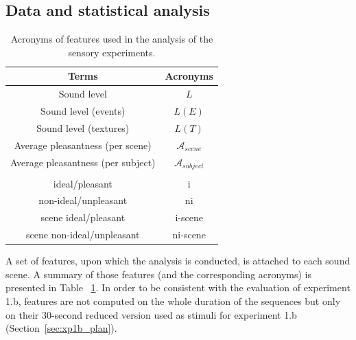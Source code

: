 \documentclass[12pt]{elsarticle}
\newcommand{\cf}{cf.}
\begin{document}
\subsection{Data and statistical analysis}
\label{sec:xp1_dataAna}

\begin{table}[t]
\centering
\begin{tabular}{c c}
Terms                              & Acronyms                   \\
\hline
Sound level                        & $L$                        \\
Sound level (events)               & $L(E)$                     \\
Sound level (textures)             & $L(T)$                     \\
Average pleasantness (per scene)   & $\mathcal{A}_{scene}$      \\
Average pleasantness (per subject) & $\mathcal{A}_{subject}$      \\
                                   &                            \\
ideal/pleasant                     & i                          \\
non-ideal/unpleasant               & ni                         \\
scene ideal/pleasant               & i-scene                    \\
scene non-ideal/unpleasant         & ni-scene                   \\
\hline
\end{tabular}
\vspace{0.5mm}
\caption{Acronyms of features used in the analysis of the sensory experiments.}
\label{tab:acronyme}
\end{table}


A set of features, upon which the analysis is conducted, is attached to each sound scene. A summary of those features (and the corresponding acronyms) is presented in Table ~\ref{tab:acronyme}. In order to be consistent with the evaluation of experiment 1.b, features are not computed on the whole duration of the sequences but only on their 30-second reduced version used as stimuli for experiment 1.b (Section~\ref{sec:xp1b_plan}).
\end{document}
